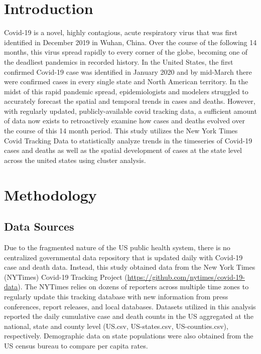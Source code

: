 \documentclass[11pt,]{article}
\begin{document}
\hypertarget{introduction}{%
\section{Introduction}\label{introduction}}

Covid-19 is a novel, highly contagious, acute respiratory virus that was
first identified in December 2019 in Wuhan, China. Over the course of
the following 14 months, this virus spread rapidly to every corner of
the globe, becoming one of the deadliest pandemics in recorded history.
In the United States, the first confirmed Covid-19 case was identified
in January 2020 and by mid-March there were confirmed cases in every
single state and North American territory. In the midst of this rapid
pandemic spread, epidemiologists and modelers struggled to accurately
forecast the spatial and temporal trends in cases and deaths. However,
with regularly updated, publicly-available covid tracking data, a
sufficient amount of data now exists to retroactively examine how cases
and deaths evolved over the course of this 14 month period. This study
utilizes the New York Times Covid Tracking Data to statistically analyze
trends in the timeseries of Covid-19 cases and deaths as well as the
spatial development of cases at the state level across the united states
using cluster analysis.

\hypertarget{methodology}{%
\section{Methodology}\label{methodology}}

\hypertarget{data-sources}{%
\subsection{Data Sources}\label{data-sources}}

Due to the fragmented nature of the US public health system, there is no
centralized governmental data repository that is updated daily with
Covid-19 case and death data. Instead, this study obtained data from the
New York Times (NYTimes) Covid-19 Tracking Project
(\url{https://github.com/nytimes/covid-19-data}). The NYTimes relies on
dozens of reporters across multiple time zones to regularly update this
tracking database with new information from press conferences, report
releases, and local databases. Datasets utilized in this analysis
reported the daily cumulative case and death counts in the US aggregated
at the national, state and county level (US.csv, US-states.csv,
US-counties.csv), respectively. Demographic data on state populations
were also obtained from the US census bureau to compare per capita
rates.
\end{document}
